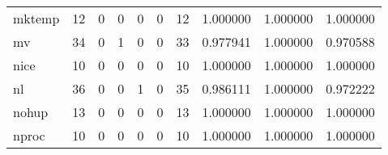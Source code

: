 \begin{tabular}{lrrrrrrrrr}
mktemp    &                                      12 &                                                  0 &                                                  0 &                                                  0 &                                                  0 &                                                 12 &                                           1.000000 &                               1.000000 &                             1.000000 \\
mv        &                                      34 &                                                  0 &                                                  1 &                                                  0 &                                                  0 &                                                 33 &                                           0.977941 &                               1.000000 &                             0.970588 \\
nice      &                                      10 &                                                  0 &                                                  0 &                                                  0 &                                                  0 &                                                 10 &                                           1.000000 &                               1.000000 &                             1.000000 \\
nl        &                                      36 &                                                  0 &                                                  0 &                                                  1 &                                                  0 &                                                 35 &                                           0.986111 &                               1.000000 &                             0.972222 \\
nohup     &                                      13 &                                                  0 &                                                  0 &                                                  0 &                                                  0 &                                                 13 &                                           1.000000 &                               1.000000 &                             1.000000 \\
nproc     &                                      10 &                                                  0 &                                                  0 &                                                  0 &                                                  0 &                                                 10 &                                           1.000000 &                               1.000000 &                             1.000000 \\

\end{tabular}
